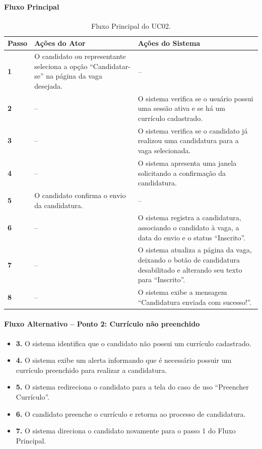 \documentclass[
    12pt,
    oneside,
    a4paper,
    brazil
]{abntex2}
\begin{document}
\paragraph{Fluxo Principal}
\begin{table}[H]
\centering
\small
\begin{tabularx}{\textwidth}{@{}>{\bfseries}p{1.2cm} L L@{}}
\toprule
Passo & Ações do Ator & Ações do Sistema \\
 & O candidato ou representante seleciona a opção ``Candidatar-se'' na página da vaga desejada. & -- \\
2 & -- & O sistema verifica se o usuário possui uma sessão ativa e se há um currículo cadastrado. \\
3 & -- & O sistema verifica se o candidato já realizou uma candidatura para a vaga selecionada. \\
4 & -- & O sistema apresenta uma janela solicitando a confirmação da candidatura. \\
5 & O candidato confirma o envio da candidatura. & -- \\
6 & -- & O sistema registra a candidatura, associando o candidato à vaga, a data do envio e o status ``Inscrito''. \\
7 & -- & O sistema atualiza a página da vaga, deixando o botão de candidatura desabilitado e alterando seu texto para ``Inscrito''. \\
8 & -- & O sistema exibe a mensagem ``Candidatura enviada com sucesso!''. \\
\bottomrule
\end{tabularx}
\caption{Fluxo Principal do UC02.}
\label{tab:uc02_fluxo_principal}
\end{table}

\paragraph{Fluxo Alternativo -- Ponto 2: Currículo não preenchido}
\begin{itemize}
    \item \textbf{3.} O sistema identifica que o candidato não possui um currículo cadastrado.
    \item \textbf{4.} O sistema exibe um alerta informando que é necessário possuir um currículo preenchido para realizar a candidatura.
    \item \textbf{5.} O sistema redireciona o candidato para a tela do caso de uso ``Preencher Currículo''.
    \item \textbf{6.} O candidato preenche o currículo e retorna ao processo de candidatura.
    \item \textbf{7.} O sistema direciona o candidato novamente para o passo 1 do Fluxo Principal.
\end{itemize}
\end{document}

